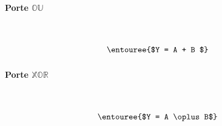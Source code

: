 \documentclass{report}
\begin{document}
\begin{multicols*}{3}
    \paragraph{Porte $\mathbb{OU}$}
    \mbox{}\vspace{1em}\\
    \begin{minipage}{\columnwidth}
        \begin{minipage}[b]{0.5\columnwidth}
            \centering
            \orgate
        \end{minipage}%
        \begin{minipage}[b]{0.5\columnwidth}
            \centering
        \end{minipage}
    \end{minipage}
    \[\entouree{$Y = A + B $} \]



    \paragraph{Porte $\mathbb{XOR}$}
    \mbox{}\vspace{1em}\\
    \begin{minipage}{\columnwidth}
        \begin{minipage}[b]{0.5\columnwidth}
            \centering
            \xorgate
        \end{minipage}%
        \begin{minipage}[b]{0.5\columnwidth}
            \centering
        \end{minipage}
    \end{minipage} 
    \[\entouree{$Y = A \oplus B$} \]
    \columnbreak




\end{multicols*}
\end{document}
